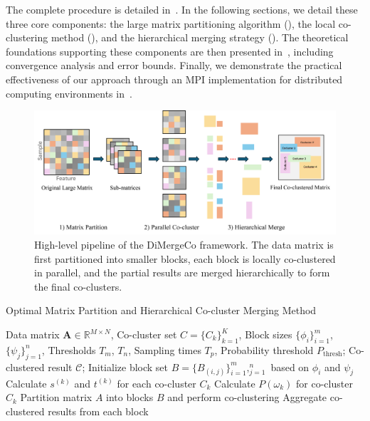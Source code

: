 \documentclass[journal]{IEEEtran}
\begin{document}
The complete procedure is detailed in~. In the following sections, we detail these three core components: the large matrix partitioning algorithm (), the local co-clustering method (), and the hierarchical merging strategy (). The theoretical foundations supporting these components are then presented in~, including convergence analysis and error bounds. Finally, we demonstrate the practical effectiveness of our approach through an MPI implementation for distributed computing environments in~.

\begin{figure}[t]
    \centering
    \includegraphics[width=0.8\linewidth]{workflow.png} %
    \caption{High-level pipeline of the DiMergeCo framework. The data matrix is first partitioned into smaller blocks, each block is locally co-clustered in parallel, and the partial results are merged hierarchically to form the final co-clusters.}
    \label{fig:DiMergeCo-pipeline}
\end{figure}


\begin{algorithm}[!t]
    \caption{Optimal Matrix Partition and Hierarchical Co-cluster Merging Method}
    \begin{algorithmic}[1]
        \REQUIRE Data matrix $\mathbf{A} \in \mathbb{R}^{M \times N}$, Co-cluster set $C = \{C_k\}_{k=1}^K$, Block sizes $\{\phi_i\}_{i=1}^m$, $\{\psi_j\}_{j=1}^n$, Thresholds $T_m$, $T_n$, Sampling times $T_p$, Probability threshold $P_\text{thresh}$;
        \ENSURE Co-clustered result $\mathcal{C}$;
        \STATE Initialize block set $B = \{B_{(i,j)}\}_{i=1}^m,_{j=1}^n$ based on $\phi_i$ and $\psi_j$
        \STATE Calculate $s^{(k)}$ and $t^{(k)}$ for each co-cluster $C_k$
        \STATE Calculate $P(\omega_k)$ for co-cluster $C_k$
        \STATE Partition matrix $A$ into blocks $B$ and perform co-clustering
        \STATE Aggregate co-clustered results from each block
        \ENDIF
        \ENDFOR
        \
    \end{algorithmic}
    \label{alg:method}
\end{algorithm}
\end{document}
